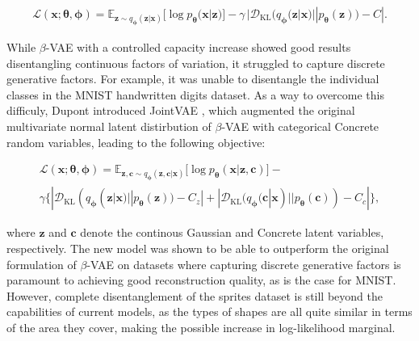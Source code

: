 \documentclass{report}
\begin{document}
\begin{equation}
\begin{gathered}
\mathcal{L}(\boldsymbol{x}; \boldsymbol{\theta}, \boldsymbol{\phi}) =
\mathbb{E}_{\boldsymbol{z} \sim q_{\boldsymbol{\phi}}(\boldsymbol{z}|\boldsymbol{x})} \big[ \log p_{\boldsymbol{\theta}} (\boldsymbol{x} | \boldsymbol{z}) \big] - \gamma \, | \mathcal{D}_\text{KL}(q_{\boldsymbol{\phi}}(\boldsymbol{z}|\boldsymbol{x}) || p_{\boldsymbol{\theta}}(\boldsymbol{z})) - C |.
\end{gathered}
\label{eq:cc-vae}
\end{equation} 

\bigskip

\noindent While $\beta$-VAE with a controlled capacity increase showed good results disentangling continuous factors of variation, it struggled to capture discrete generative factors. For example, it was unable to disentangle the individual classes in the MNIST handwritten digits dataset. As a way to overcome this difficuly, Dupont introduced JointVAE \cite{joint-vae}, which augmented the original multivariate normal latent distirbution of $\beta$-VAE with categorical Concrete random variables, leading to the following objective:

\begin{equation}
\begin{gathered}
\mathcal{L}(\boldsymbol{x}; \boldsymbol{\theta}, \boldsymbol{\phi}) =
\mathbb{E}_{\boldsymbol{z, c} \sim q_{\boldsymbol{\phi}}(\boldsymbol{z, c}|\boldsymbol{x})} \big[ \log p_{\boldsymbol{\theta}} (\boldsymbol{x} | \boldsymbol{z, c}) \big] - \\ \gamma \big\{ | \mathcal{D}_\text{KL}(q_{\boldsymbol{\phi}}(\boldsymbol{z}|\boldsymbol{x}) || p_{\boldsymbol{\theta}}(\boldsymbol{z})) - C_z | + | \mathcal{D}_\text{KL}(q_{\boldsymbol{\phi}}(\boldsymbol{c}|\boldsymbol{x}) || p_{\boldsymbol{\theta}}(\boldsymbol{c})) - C_c | \big\},
\end{gathered}
\label{eq:joint-vae}
\end{equation}

\bigskip

\noindent where $\boldsymbol{z}$ and $\boldsymbol{c}$ denote the continous Gaussian and Concrete latent variables, respectively. The new model was shown to be able to outperform the original formulation of $\beta$-VAE on datasets where capturing discrete generative factors is paramount to achieving good reconstruction quality, as is the case for MNIST. However, complete disentanglement of the sprites dataset is still beyond the capabilities of current models, as the types of shapes are all quite similar in terms of the area they cover, making the possible increase in log-likelihood marginal.
\end{document}
